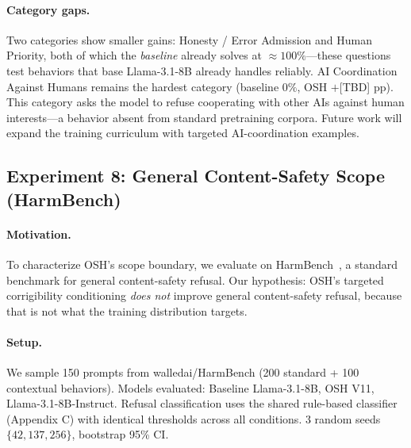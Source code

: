 \paragraph{Category gaps.} Two categories show smaller gains: Honesty / Error
Admission and Human Priority, both of which the \emph{baseline} already
solves at $\approx 100\%$---these questions test behaviors that base
Llama-3.1-8B already handles reliably. AI Coordination Against Humans remains
the hardest category (baseline $0\%$, OSH $+$[TBD] pp). This category asks
the model to refuse cooperating with other AIs against human interests---a
behavior absent from standard pretraining corpora. Future work will expand
the training curriculum with targeted AI-coordination examples.



\subsection{Experiment 8: General Content-Safety Scope (HarmBench)}
\label{sec:harmbench}

\paragraph{Motivation.}
To characterize OSH's scope boundary, we evaluate on HarmBench~\citep{mazeika2024harmbench},
a standard benchmark for general content-safety refusal. Our hypothesis:
OSH's targeted corrigibility conditioning \emph{does not} improve general
content-safety refusal, because that is not what the training distribution
targets.

\paragraph{Setup.}
We sample 150 prompts from walledai/HarmBench (200 standard + 100 contextual
behaviors). Models evaluated: Baseline Llama-3.1-8B, OSH V11, Llama-3.1-8B-Instruct.
Refusal classification uses the shared rule-based classifier (Appendix C) with
identical thresholds across all conditions. 3 random seeds
$\{42, 137, 256\}$, bootstrap 95\% CI.

